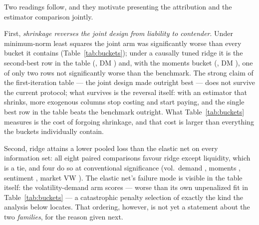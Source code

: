 Two readings follow, and they motivate presenting the
attribution and the estimator comparison jointly.

First, \emph{shrinkage reverses the joint design from liability to
contender}. Under minimum-norm least squares the joint arm was
significantly worse than every bucket it contains
(Table~\ref{tab:buckets}); under a causally tuned ridge it is the
second-best row in the table (\unifBrTunedAllFeaturesQLIKE{}, DM
\unifBrTunedAllFeaturesDM{}) and, with the moments bucket
(\unifBrTunedMomentsQLIKE{}, DM \unifBrTunedMomentsDM{}), one of only
two rows not significantly worse than the benchmark. The strong claim of
the first-iteration table --- the joint design made outright best ---
does not survive the current protocol; what survives is the reversal
itself: with an estimator that shrinks, more exogenous columns stop
costing and start paying, and the single best row in the table beats the
benchmark outright. What Table~\ref{tab:buckets} measures is the cost of
forgoing shrinkage, and that cost is larger than everything the buckets
individually contain.

Second, ridge attains a lower pooled loss than the elastic net on every
information set: all eight paired comparisons favour ridge except
liquidity, which is a tie, and four do so at conventional significance
(vol.\ demand \unifIncrBeTunedVolDemandDM{}, moments
\unifIncrBeTunedMomentsDM{}, sentiment \unifIncrBeTunedSentimentDM{},
market VW \unifIncrBeTunedMarketVwDM{}). The elastic net's failure mode
is visible in the table itself: the volatility-demand arm scores
\unifBeTunedVolDemandQLIKE{} --- worse than its own unpenalized fit in
Table~\ref{tab:buckets} --- a catastrophic penalty selection of exactly
the kind the analysis below locates. That ordering, however, is not yet
a statement about the two \emph{families}, for the reason given next.

